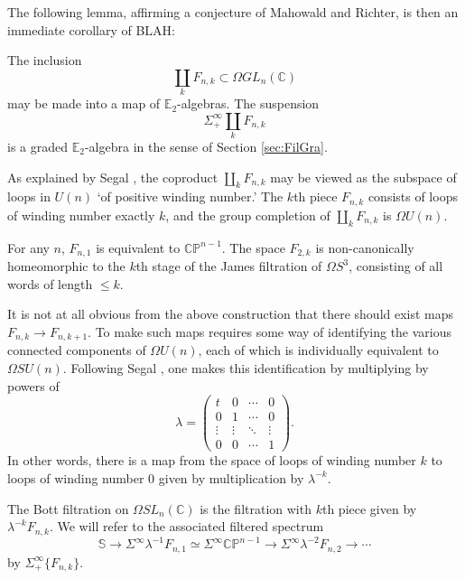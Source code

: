 The following lemma, affirming a conjecture of Mahowald and Richter, is then an immediate corollary of BLAH:

\begin{lem}  
The inclusion 
$$\coprod_k F_{n,k} \subset \Omega GL_n(\mathbb{C})$$
may be made into a map of $\mathbb{E}_2$-algebras.  The suspension $$\Sigma^{\infty}_+ \coprod_k F_{n,k}$$ is a graded $\mathbb{E}_2$-algebra in the sense of Section \ref{sec:FilGra}.
\end{lem}

As explained by Segal \cite{Segal}, the coproduct $\coprod_k F_{n,k}$ may be viewed as the subspace of loops in $U(n)$ `of positive winding number.'  The $k$th piece $F_{n,k}$ consists of loops of winding number exactly $k$, and the group completion of $\coprod_k F_{n,k}$ is $\Omega U(n)$.

\begin{exm}
For any $n$, $F_{n,1}$ is equivalent to $\mathbb{CP}^{n-1}$.  The space $F_{2,k}$ is non-canonically homeomorphic to the $k$th stage of the James filtration of $\Omega S^3$, consisting of all words of length $\le k$.
\end{exm}

It is not at all obvious from the above construction that there should exist maps $F_{n,k} \rightarrow F_{n,k+1}$.  To make such maps requires some way of identifying the various connected components of $\Omega U(n)$, each of which is individually equivalent to $\Omega SU(n)$.  Following Segal \cite[pg. 3--4]{Segal}, one makes this identification by multiplying by powers of 
$$\lambda = \left( \begin{array}{cccc} t & 0 & \cdots & 0 \\ 0 & 1 & \cdots & 0 \\ \vdots & \vdots & \ddots & \vdots \\ 0 & 0 & \cdots & 1 \end{array} \right).$$
In other words, there is a map from the space of loops of winding number $k$ to loops of winding number $0$ given by multiplication by $\lambda^{-k}$.

\begin{dfn}
The Bott filtration on $\Omega SL_n(\mathbb{C})$ is the filtration with $k$th piece given by $\lambda^{-k} F_{n,k}$.  We will refer to the associated filtered spectrum 
$$\mathbb{S} \rightarrow \Sigma^{\infty} \lambda^{-1} F_{n,1} \simeq \Sigma^{\infty} \mathbb{CP}^{n-1} \rightarrow \Sigma^{\infty} \lambda^{-2} F_{n,2} \rightarrow \cdots$$
by $\Sigma^{\infty}_+ \{F_{n,k}\}$.
\end{dfn}

